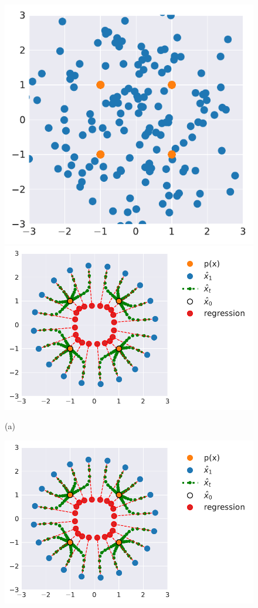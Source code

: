 


\begin{figure}
\small
    \centering
    \begin{minipage}[c]{.445\linewidth}
    \centering
    \includegraphics[width=.49\linewidth,clip,trim=0 0 5 0]{./assets/toy_example_2d/2d_toyexample_px_py.pdf}
    \includegraphics[width=.49\linewidth,clip,trim=0 0 125 0]{./assets/toy_example_2d/2d_toyexample_estim_large_radius.pdf}
    
    (a) 
    \end{minipage}
    \begin{minipage}[c]{.09\linewidth}
    \centering
    \includegraphics[width=\linewidth,clip,trim=260 0 10 0]{./assets/toy_example_2d/2d_toyexample_estim_large_radius.pdf}


\end{minipage}
\end{figure}
